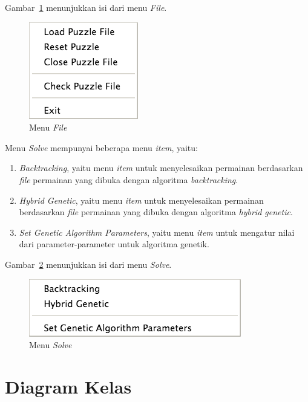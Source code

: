 Gambar~\ref{fig:perancanganguimenufile} menunjukkan isi dari menu \textit{File}.

\begin{figure}
\centering
\captionsetup{justification=centering}
\includegraphics[scale=0.5]{Gambar/Perancangan/PerancanganGUIMenuFile.png}
\caption[Menu \textit{File}]{Menu \textit{File}}
\label{fig:perancanganguimenufile}
\end{figure}

Menu \textit{Solve} mempunyai beberapa menu \textit{item}, yaitu:
\begin{enumerate}
\item \textit{Backtracking}, yaitu menu \textit{item} untuk menyelesaikan permainan berdasarkan \textit{file} permainan yang dibuka dengan algoritma \textit{backtracking}.
\item \textit{Hybrid Genetic}, yaitu menu \textit{item} untuk menyelesaikan permainan berdasarkan \textit{file} permainan yang dibuka dengan algoritma \textit{hybrid genetic}.
\item \textit{Set Genetic Algorithm Parameters}, yaitu menu \textit{item} untuk mengatur nilai dari parameter-parameter untuk algoritma genetik.
\end{enumerate}

Gambar~\ref{fig:perancanganguimenusolve} menunjukkan isi dari menu \textit{Solve}.

\begin{figure}
\centering
\captionsetup{justification=centering}
\includegraphics[scale=0.5]{Gambar/Perancangan/PerancanganGUIMenuSolve.png}
\caption[Menu \textit{Solve}]{Menu \textit{Solve}}
\label{fig:perancanganguimenusolve}
\end{figure}

\section{Diagram Kelas}
\label{sec:diagramkelas}

